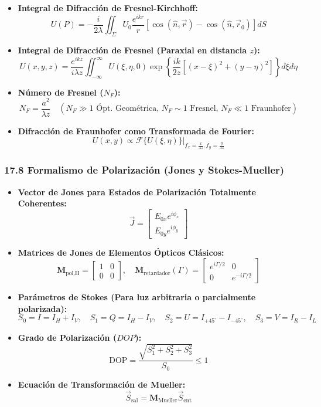 \documentclass[11pt,a4paper]{article}
\begin{document}
\begin{itemize}
  \item \textbf{Integral de Difracción de Fresnel-Kirchhoff:}
  \[
    U(P) = -\frac{i}{2\lambda} \iint_{\Sigma} U_0 \frac{e^{i k r}}{r} [\cos(\hat{n}, \vec{r}) - \cos(\hat{n}, \vec{r}_0)] dS
  \]
  \item \textbf{Integral de Difracción de Fresnel (Paraxial en distancia $z$):}
  \[
    U(x, y, z) = \frac{e^{i k z}}{i \lambda z} \iint_{-\infty}^{\infty} U(\xi, \eta, 0) \exp\left\{ \frac{i k}{2z}\left[ (x - \xi)^2 + (y - \eta)^2 \right] \right\} d\xi d\eta
  \]
  \item \textbf{Número de Fresnel ($N_F$):}
  \[
    N_F = \frac{a^2}{\lambda z} \quad (N_F \gg 1 \text{ Ópt. Geométrica}, \, N_F \sim 1 \text{ Fresnel}, \, N_F \ll 1 \text{ Fraunhofer})
  \]
  \item \textbf{Difracción de Fraunhofer como Transformada de Fourier:}
  \[
    U(x, y) \propto \mathcal{F}\{U(\xi, \eta)\}\Big|_{f_x = \frac{x}{\lambda z}, f_y = \frac{y}{\lambda z}}
  \]
\end{itemize}

\subsubsection*{17.8 Formalismo de Polarización (Jones y Stokes-Mueller)}

\begin{itemize}
  \item \textbf{Vector de Jones para Estados de Polarización Totalmente Coherentes:}
  \[
    \vec{J} = \begin{bmatrix} E_{0x} e^{i\phi_x} \\ E_{0y} e^{i\phi_y} \end{bmatrix}
  \]
  \item \textbf{Matrices de Jones de Elementos Ópticos Clásicos:}
  \[
    \mathbf{M}_{\text{pol,H}} = \begin{bmatrix} 1 & 0 \\ 0 & 0 \end{bmatrix}, \quad \mathbf{M}_{\text{retardador}}(\Gamma) = \begin{bmatrix} e^{i\Gamma/2} & 0 \\ 0 & e^{-i\Gamma/2} \end{bmatrix}
  \]
  \item \textbf{Parámetros de Stokes (Para luz arbitraria o parcialmente polarizada):}
  \[
    S_0 = I = I_H + I_V, \quad S_1 = Q = I_H - I_V, \quad S_2 = U = I_{+45^\circ} - I_{-45^\circ}, \quad S_3 = V = I_R - I_L
  \]
  \item \textbf{Grado de Polarización ($DOP$):}
  \[
    \text{DOP} = \frac{\sqrt{S_1^2 + S_2^2 + S_3^2}}{S_0} \le 1
  \]
  \item \textbf{Ecuación de Transformación de Mueller:}
  \[
    \vec{S}_{\text{sal}} = \mathbf{M}_{\text{Mueller}} \vec{S}_{\text{ent}}
  \]
\end{itemize}
\end{document}
